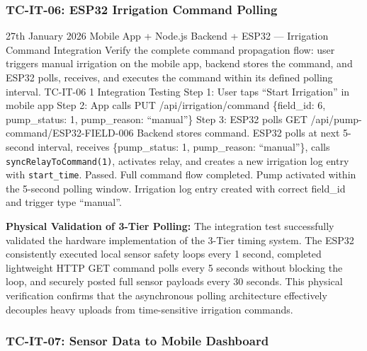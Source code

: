 \subsubsection{TC-IT-06: ESP32 Irrigation Command Polling}

\testcase%
{27th January 2026}%
{Mobile App + Node.js Backend + ESP32 --- Irrigation
Command Integration}%
{Verify the complete command propagation flow: user
triggers manual irrigation on the mobile app, backend
stores the command, and ESP32 polls, receives, and
executes the command within its defined polling interval.}%
{TC-IT-06}%
{1}%
{Integration Testing}%
{Step 1: User taps ``Start Irrigation'' in mobile app
\newline
Step 2: App calls PUT /api/irrigation/command \newline
\{field\_id: 6, pump\_status: 1, pump\_reason:
``manual''\} \newline
Step 3: ESP32 polls GET /api/pump-command/ESP32-FIELD-006}%
{Backend stores command. ESP32 polls at next 5-second
interval, receives \{pump\_status: 1, pump\_reason:
``manual''\}, calls \texttt{syncRelayToCommand(1)},
activates relay, and creates a new irrigation log entry
with \texttt{start\_time}.}%
{Passed. Full command flow completed. Pump activated within
the 5-second polling window. Irrigation log entry created
with correct field\_id and trigger type ``manual''.}

\vspace{0.5em}
\noindent\textbf{Physical Validation of 3-Tier Polling:} The integration test successfully validated the hardware implementation of the 3-Tier timing system. The ESP32 consistently executed local sensor safety loops every 1 second, completed lightweight HTTP GET command polls every 5 seconds without blocking the loop, and securely posted full sensor payloads every 30 seconds. This physical verification confirms that the asynchronous polling architecture effectively decouples heavy uploads from time-sensitive irrigation commands.

\subsubsection{TC-IT-07: Sensor Data to Mobile Dashboard}

